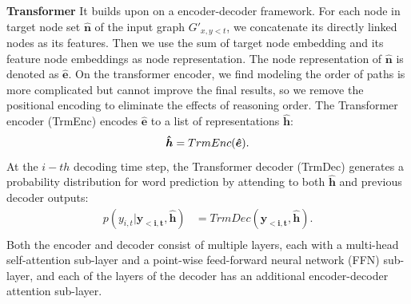 \documentclass[letterpaper]{article} %
\begin{document}
\medskip\noindent\textbf{Transformer}\hspace{1em} It builds upon on a encoder-decoder framework.
For each node in target node set $\bm{\hat{n}}$ of the input graph $G'_{x,y<t}$, we concatenate its directly linked nodes as its features. Then we use the sum of target node embedding and its feature node embeddings as node representation. The node representation of $\bm{\hat{n}}$ is denoted as $\bm{\hat{e}}$. On the transformer encoder, we find modeling the order of paths is more complicated but cannot improve the final results, so we remove the positional encoding to eliminate the effects of reasoning order.
The Transformer encoder (TrmEnc) encodes $\bm{\hat{e}}$ to a list of representations $\bm{\hat{h}}$: 
\begin{equation}
\bm{\hat{h}} = TrmEnc(\bm{\hat{e}}). \\
\end{equation}
At the $i-{th}$ decoding time step, the Transformer decoder (TrmDec)  generates a probability distribution for word prediction by attending to both $\bm{\hat{h}}$ and previous decoder outputs:
\begin{equation}
\begin{split}
p(y_{i,t}|\bm{y_{<i,t}}, \bm{\hat{h}}) &= TrmDec(\bm{y_{<i,t}}, \bm{\hat{h}}). \\
\end{split}
\end{equation}
Both the encoder and decoder consist of multiple layers, each with a multi-head self-attention sub-layer and a point-wise feed-forward neural network (FFN) sub-layer, and each of the layers of the decoder has an additional encoder-decoder attention sub-layer.
\end{document}
